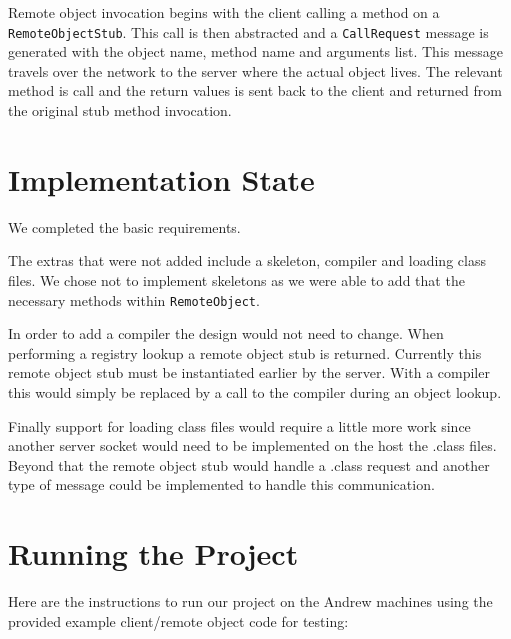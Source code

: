 \documentclass[12pt]{article}
\begin{document}
Remote object invocation begins with the client calling a method on a \texttt{RemoteObjectStub}. This call is then abstracted and a \texttt{CallRequest} message is generated with the object name, method name and arguments list. This message travels over the network to the server where the actual object lives. The relevant method is call and the return values is sent back to the client and returned from the original stub method invocation.


\section{Implementation State}

We completed the basic requirements.

The extras that were not added include a skeleton, compiler and loading class files. We chose not to implement skeletons as we were able to add that the necessary methods within \texttt{RemoteObject}.

In order to add a compiler the design would not need to change. When performing a registry lookup a remote object stub is returned. Currently this remote object stub must be instantiated earlier by the server. With a compiler this would simply be replaced by a call to the compiler during an object lookup.

Finally support for loading class files would require a little more work since another server socket would need to be implemented on the host the .class files. Beyond that the remote object stub would handle a .class request and another type of message could be implemented to handle this communication.


\section{Running the Project}

Here are the instructions to run our project on the Andrew machines using the provided example client/remote object code for testing: 
\end{document}
